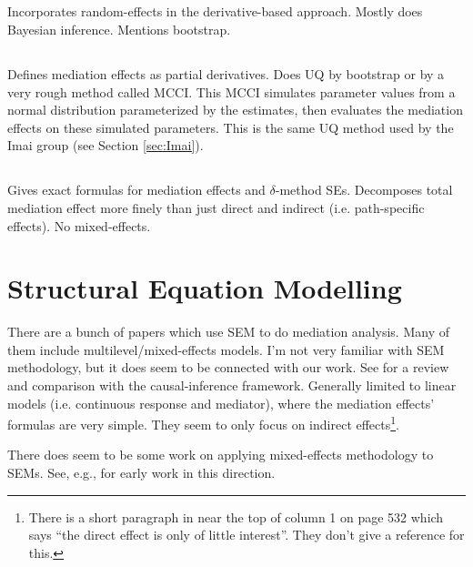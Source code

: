 \documentclass{article}
\begin{document}
\subsection{\citet{Mar24}}

Incorporates random-effects in the derivative-based approach. Mostly does Bayesian inference. Mentions bootstrap.

\subsection{\citet{Gel18}}

Defines mediation effects as partial derivatives. Does UQ by bootstrap or by a very rough method called MCCI. This MCCI simulates parameter values from a normal distribution parameterized by the estimates, then evaluates the mediation effects on these simulated parameters. This is the same UQ method used by the Imai group (see Section \ref{sec:Imai}).


\subsection{\citet{Dor22}}

Gives exact formulas for mediation effects and $\delta$-method SEs. Decomposes total mediation effect more finely than just direct and indirect (i.e. path-specific effects). No mixed-effects.

\section{Structural Equation Modelling}
\label{sec:SEM}

There are a bunch of papers which use SEM to do mediation analysis. Many of them include multilevel/mixed-effects models. I'm not very familiar with SEM methodology, but it does seem to be connected with our work. See \citet{Val13} for a review and comparison with the causal-inference framework. Generally limited to linear models (i.e. continuous response and mediator), where the mediation effects' formulas are very simple. They seem to only focus on indirect effects\footnote{There is a short paragraph in \citet{Zit21} near the top of column 1 on page 532 which says ``the direct effect is only of little interest''. They don't give a reference for this.}.

There does seem to be some work on applying mixed-effects methodology to SEMs. See, e.g., \citet{Rab04} for early work in this direction.
\end{document}
